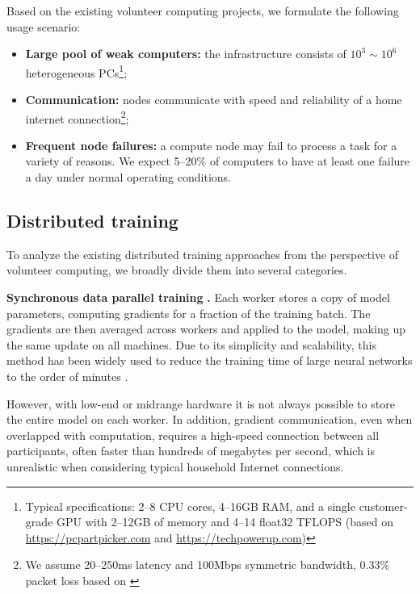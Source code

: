 Based on the existing volunteer computing projects, we formulate the following usage scenario:
\vspace{-4px}
\begin{itemize}[leftmargin=*]
    \item \textbf{Large pool of weak computers:} the infrastructure consists of $10^3 \sim 10^6$ heterogeneous PCs\footnote{Typical specifications: 2--8 CPU cores, 4--16GB RAM, and a single customer-grade GPU with 2--12GB of memory and 4--14 float32 TFLOPS (based on \url{https://pcpartpicker.com} and \url{https://techpowerup.com})};
    \item \textbf{Communication:} nodes communicate with speed and reliability of a home internet connection\footnote{We assume 20--250ms latency and 100Mbps symmetric bandwidth, $0.33\%$ packet loss based on \cite{speedtest,li2017case}};
    \item \textbf{Frequent node failures:} a compute node may fail to process a task for a variety of reasons. We expect 5--20\% of computers to have at least one failure a day under normal operating conditions.
\end{itemize}
\vspace{-6px}

\subsection{Distributed training}\label{sect:related_distributed}
\vspace{-3px}

To analyze the existing distributed training approaches from the perspective of volunteer computing, we broadly divide them into several categories.

\textbf{Synchronous data parallel training} \cite{valiant1990bridging}\textbf{.} Each worker stores a copy of model parameters, computing gradients for a fraction of the training batch. The gradients are then averaged across workers and applied to the model, making up the same update on all machines. Due to its simplicity and scalability, this method has been widely used to reduce the training time of large neural networks to the order of minutes \cite{goyal2017accurate,You2020Large}. 
    
However, with low-end or midrange hardware it is not always possible to store the entire model on each worker. In addition, gradient communication, even when overlapped with computation, requires a high-speed connection between all participants, often faster than hundreds of megabytes per second, which is unrealistic when considering typical household Internet connections.
    
